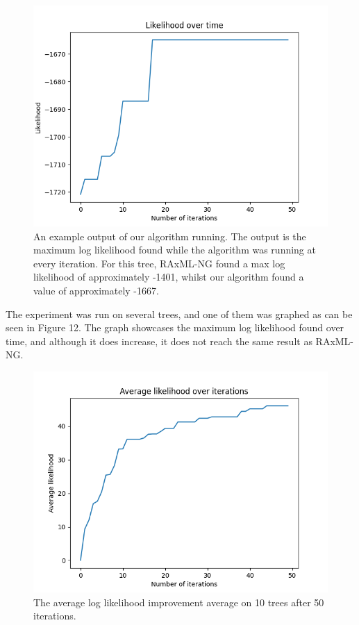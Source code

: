 \documentclass{mpaper}
\begin{document}
\begin{figure}
    \includegraphics[width=1\linewidth]{dissertation/images/alg_output.png}
    \centering
    \caption{An example output of our algorithm running. The output is the maximum log likelihood found while the algorithm was running at every iteration. For this tree, RAxML-NG found a max log likelihood of approximately -1401, whilst our algorithm found a value of approximately -1667.}
\end{figure}

The experiment was run on several trees, and one of them was graphed as can be seen in Figure 12. The graph showcases the maximum log likelihood found over time, and although it does increase, it does not reach the same result as RAxML-NG.

\begin{figure}
    \includegraphics[width=1\linewidth]{dissertation/images/average_likelihood_improvement.png}
    \centering
    \caption{The average log likelihood improvement average on 10 trees after 50 iterations.}
\end{figure}
\end{document}
